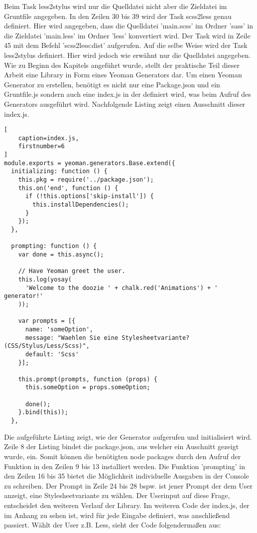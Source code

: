 Beim Task less2stylus wird nur die Quelldatei nicht aber die Zieldatei im Gruntfile angegeben.\newline\newline
In den Zeilen 30 bis 39 wird der Task scss2less genau definiert. Hier wird angegeben, dass die Quelldatei 'main.scss' im Ordner 'sass' in die Zieldatei 'main.less' im Ordner 'less' konvertiert wird. Der Task wird in Zeile 45 mit dem Befehl 'scss2less:dist' aufgerufen.\newline
Auf die selbe Weise wird der Task less2stylus definiert. Hier wird jedoch wie erwähnt nur die Quelldatei angegeben.\newline\newline
Wie zu Beginn des Kapitels angeführt wurde, stellt der praktische Teil dieser Arbeit eine Library in Form eines Yeoman Generators dar. Um einen Yeoman Generator zu erstellen, benötigt es nicht nur eine Package.json und ein Gruntfile.js sondern auch eine index.js in der definiert wird, was beim Aufruf des Generators ausgeführt wird. Nachfolgende Listing zeigt einen Ausschnitt dieser index.js.
\begin{lstlisting}[
	caption=index.js,
	firstnumber=6
]
module.exports = yeoman.generators.Base.extend({
  initializing: function () {
    this.pkg = require('../package.json');
    this.on('end', function () {
      if (!this.options['skip-install']) {
        this.installDependencies();
      }
    });
  },

  prompting: function () {
    var done = this.async();

    // Have Yeoman greet the user.
    this.log(yosay(
      'Welcome to the doozie ' + chalk.red('Animations') + ' generator!'
    ));

    var prompts = [{
      name: 'someOption',
      message: "Waehlen Sie eine Stylesheetvariante? (CSS/Stylus/Less/Scss)",
      default: 'Scss'
    }];

    this.prompt(prompts, function (props) {
      this.someOption = props.someOption;

      done();
    }.bind(this));
  },
\end{lstlisting}
Die aufgeführte Listing zeigt, wie der Generator aufgerufen und initialisiert wird. Zeile 8 der Listing bindet die package.json, aus welcher ein Auschnitt gezeigt wurde, ein.\newline
Somit können die benötigten node packages durch den Aufruf der Funktion in den Zeilen 9 bis 13 installiert werden.\newline
Die Funktion 'prompting' in den Zeilen 16 bis 35 bietet die Möglichkeit individuelle Ausgaben in der Console zu schreiben. Der Prompt in Zeile 24 bis 28 bspw. ist jener Prompt der dem User anzeigt, eine Stylesheetvariante zu wählen. Der Userinput auf diese Frage, entscheidet den weiteren Verlauf der Library. Im weiteren Code der index.js, der im Anhang zu sehen ist, wird für jede Eingabe definiert, was anschließend passiert. Wählt der User z.B. Less, sieht der Code folgendermaßen aus:
